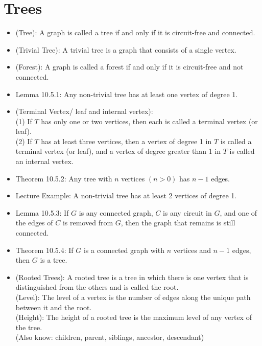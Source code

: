 \documentclass{article}
\begin{document}
\section*{Trees}
\begin{itemize}
    \item (Tree): A graph is called a tree if and only if it is circuit-free and connected.
    \item (Trivial Tree): A trivial tree is a graph that consists of a single vertex.
    \item (Forest): A graph is called a forest if and only if it is circuit-free and not connected.
    \item Lemma 10.5.1: Any non-trivial tree has at least one vertex of degree 1.
    \item (Terminal Vertex/ leaf and internal vertex): 
        \\ \hspace*{3mm} (1) If $T$ has only one or two vertices, then each is called a terminal vertex (or leaf).
        \\ \hspace*{3mm} (2) If $T$ has at least three vertices, then a vertex of degree 1 in $T$ is called a terminal vertex (or leaf), and a \hspace*{9mm} vertex of degree greater than 1 in $T$ is called an internal vertex.
    \item Theorem 10.5.2: Any tree with $n$ vertices $(n>0)$ has $n-1$ edges.
    \item Lecture Example: A non-trivial tree has at least 2 vertices of degree 1.
    \item Lemma 10.5.3: If $G$ is any connected graph, $C$ is any circuit in $G$, and one of the edges of $C$ is removed from $G$, then the graph that remains is still connected.
    \item Theorem 10.5.4: If $G$ is a connected graph with $n$ vertices and $n-1$ edges, then $G$ is a tree.
    \item (Rooted Trees): A rooted tree is a tree in which there is one vertex that is distinguished from the others and is called the root.\\ (Level): The level of a vertex is the number of edges along the unique path between it and the root.\\ (Height): The height of a rooted tree is the maximum level of any vertex of the tree.\\(Also know: children, parent, siblings, ancestor, descendant)

\end{itemize}
\end{document}
